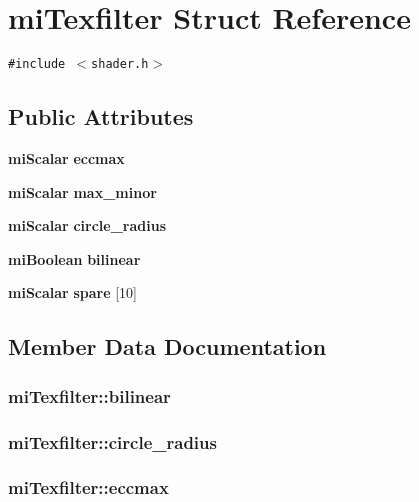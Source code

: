 \section{mi\-Texfilter Struct Reference}
\label{structmiTexfilter}
{\tt \#include $<$shader.h$>$}

\subsection*{Public Attributes}
\begin{CompactItemize}
\item 
{\bf mi\-Scalar} {\bf eccmax}
\item 
{\bf mi\-Scalar} {\bf max\_\-minor}
\item 
{\bf mi\-Scalar} {\bf circle\_\-radius}
\item 
{\bf mi\-Boolean} {\bf bilinear}
\item 
{\bf mi\-Scalar} {\bf spare} [10]
\end{CompactItemize}


\subsection{Member Data Documentation}
\subsubsection{ {\bf mi\-Texfilter::bilinear}}\label{structmiTexfilter_o3}


\subsubsection{ {\bf mi\-Texfilter::circle\_\-radius}}\label{structmiTexfilter_o2}


\subsubsection{ {\bf mi\-Texfilter::eccmax}}\label{structmiTexfilter_o0}


